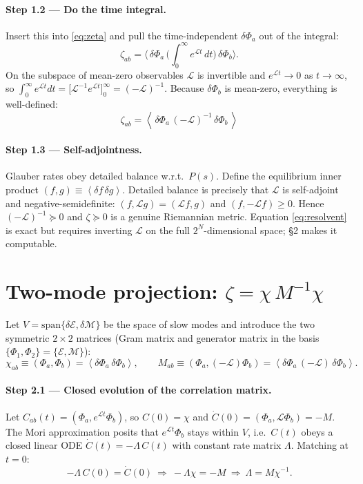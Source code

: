 \documentclass[11pt]{article}
\newcommand{\eq}{\mathcal{E}}
\newcommand{\mg}{\mathcal{M}}
\newcommand{\LL}{\mathcal{L}}
\newcommand{\avg}[1]{\left\langle #1 \right\rangle}
\newcommand{\dPhi}{\delta\Phi}
\begin{document}
\paragraph{Step 1.2 --- Do the time integral.}
Insert this into \eqref{eq:zeta} and pull the time-independent $\dPhi_a$ out of the integral:
\begin{equation}
\zeta_{ab}=\Big\langle\,\dPhi_a\,\Big(\!\int_0^\infty\! e^{\LL t}\,dt\Big)\,\dPhi_b\Big\rangle .
\end{equation}
On the subspace of mean-zero observables $\LL$ is invertible and $e^{\LL t}\to0$ as $t\to\infty$, so
$\int_0^\infty e^{\LL t}dt=\big[\LL^{-1}e^{\LL t}\big]_0^\infty=(-\LL)^{-1}$. Because $\dPhi_b$ is
mean-zero, everything is well-defined:
\begin{equation}
\boxed{\;\zeta_{ab}=\avg{\,\dPhi_a\,(-\LL)^{-1}\,\dPhi_b\,}\;}
\tag{1}\label{eq:resolvent}
\end{equation}

\paragraph{Step 1.3 --- Self-adjointness.}
Glauber rates obey detailed balance w.r.t.\ $P(s)$. Define the equilibrium inner product
$(f,g)\equiv\avg{\delta f\,\delta g}$. Detailed balance is precisely that $\LL$ is self-adjoint and
negative-semidefinite: $(f,\LL g)=(\LL f,g)$ and $(f,-\LL f)\ge0$. Hence $(-\LL)^{-1}\succeq0$ and
$\zeta\succeq0$ is a genuine Riemannian metric. Equation \eqref{eq:resolvent} is exact but requires
inverting $\LL$ on the full $2^N$-dimensional space; \S2 makes it computable.

\section{Two-mode projection: \texorpdfstring{$\zeta=\chi\,M^{-1}\chi$}{zeta = chi M^-1 chi}}

Let $V=\mathrm{span}\{\delta\eq,\delta\mg\}$ be the space of slow modes and introduce the two
symmetric $2\times2$ matrices (Gram matrix and generator matrix in the basis
$\{\Phi_1,\Phi_2\}=\{\eq,\mg\}$):
\begin{equation}
\chi_{ab}\equiv(\Phi_a,\Phi_b)=\avg{\dPhi_a\,\dPhi_b},
\qquad
M_{ab}\equiv(\Phi_a,(-\LL)\Phi_b)=\avg{\dPhi_a\,(-\LL)\,\dPhi_b}.
\end{equation}

\paragraph{Step 2.1 --- Closed evolution of the correlation matrix.}
Let $C_{ab}(t)=(\Phi_a,e^{\LL t}\Phi_b)$, so $C(0)=\chi$ and $\dot C(0)=(\Phi_a,\LL\Phi_b)=-M$. The
Mori approximation posits that $e^{\LL t}\Phi_b$ stays within $V$, i.e.\ $C(t)$ obeys a closed linear
ODE $\dot C(t)=-\Lambda\,C(t)$ with constant rate matrix $\Lambda$. Matching at $t=0$:
\begin{equation}
-\Lambda\,C(0)=\dot C(0)\ \Rightarrow\ -\Lambda\chi=-M\ \Rightarrow\ \Lambda=M\chi^{-1}.
\end{equation}
\end{document}
